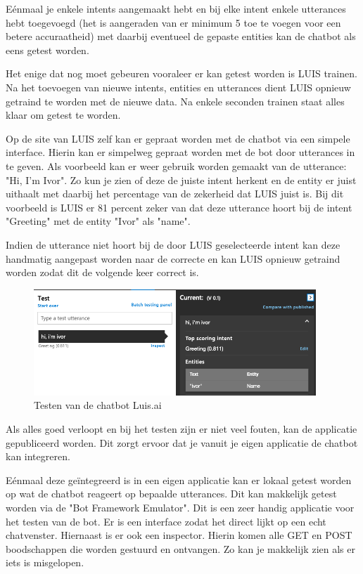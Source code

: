 Eénmaal je enkele intents aangemaakt hebt en bij elke intent enkele utterances hebt toegevoegd (het is aangeraden van er minimum 5 toe te voegen voor een betere accuraatheid) met daarbij eventueel de gepaste entities kan de chatbot als eens getest worden.

Het enige dat nog moet gebeuren vooraleer er kan getest worden is LUIS trainen. Na het toevoegen van nieuwe intents, entities en utterances dient LUIS opnieuw getraind te worden met de nieuwe data. Na enkele seconden trainen staat alles klaar om getest te worden.

Op de site van LUIS zelf kan er gepraat worden met de chatbot via een simpele interface. Hierin kan er simpelweg gepraat worden met de bot door utterances in te geven. Als voorbeeld kan er weer gebruik worden gemaakt van de utterance: "Hi, I'm Ivor". Zo kun je zien of deze de juiste intent herkent en de entity er juist uithaalt met daarbij het percentage van de zekerheid dat LUIS juist is. Bij dit voorbeeld is LUIS er 81 percent zeker van dat deze utterance hoort bij de intent "Greeting" met de entity "Ivor" als "name".

Indien de utterance niet hoort bij de door LUIS geselecteerde intent kan deze handmatig aangepast worden naar de correcte en kan LUIS opnieuw getraind worden zodat dit de volgende keer correct is.

\begin{figure}[h!]
	\centering
	\includegraphics[height=4cm]{img/test.png}
	\caption{Testen van de chatbot Luis.ai}
	\label{fig:test}
\end{figure}

Als alles goed verloopt en bij het testen zijn er niet veel fouten, kan de applicatie gepubliceerd worden. Dit zorgt ervoor dat je vanuit je eigen applicatie de chatbot kan integreren.

Eénmaal deze geïntegreerd is in een eigen applicatie kan er lokaal getest worden op wat de chatbot reageert op bepaalde utterances. Dit kan makkelijk getest worden via de "Bot Framework Emulator". Dit is een zeer handig applicatie voor het testen van de bot. Er is een interface zodat het direct lijkt op een echt chatvenster. Hiernaast is er ook een inspector. Hierin komen alle GET en POST boodschappen die worden gestuurd en ontvangen. Zo kan je makkelijk zien als er iets is misgelopen.

